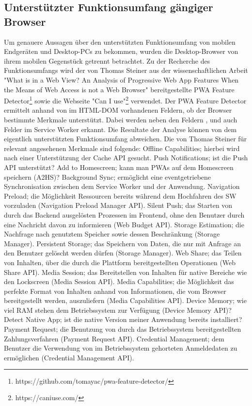 \subsection{Unterstützter Funktionsumfang gängiger Browser}
\label{subsec:unterstuetzterfunktionsumfanggaengigerbrowser}
Um genauere Aussagen über den unterstützten Funktionsumfang von mobilen Endgeräten
und Desktop-PCs zu bekommen, wurden die Desktop-Browser von ihrem mobilen
Gegenstück getrennt betrachtet. Zu der Recherche des Funktionsumfangs wird
der von Thomas Steiner aus der wissenschaftlichen Arbeit "What is
in a Web View? An Analysis of Progressive Web App Features When the
Means of Web Access is not a Web Browser" bereitgestellte
PWA Feature Detector\footnote{https://github.com/tomayac/pwa-feature-detector/} sowie 
die Webseite "Can I use"\footnote{https://caniuse.com/} verwendet.
Der PWA Feature Detector ermittelt anhand von im HTML-DOM
vorhandenen Feldern, ob der Browser bestimmte Merkmale unterstützt.
Dabei werden neben den Feldern ,  und 
auch Felder im Service Worker erkannt. Die Resultate der Analyse können von dem
eigentlich unterstützten Funktionsumfang abweichen. Die von Thomas
Steiner für relevant angesehenen Merkmale sind folgende:
Offline Capabilities; hierbei wird nach
einer Unterstützung der Cache API gesucht. Push Notifications;
ist die Push API unterstützt? Add to Homescreen; kann man PWAs auf
dem Homescreen speichern (A2HS)? Background Sync; ermöglicht eine eventgetriebene Synchronisation
zwischen dem Service Worker und der Anwendung. Navigation Preload; die Möglichkeit
Ressourcen bereits während dem Hochfahren des SW vorzuladen
(Navigation Preload Manager API). Silent Push; das Starten von durch das
Backend ausgelösten Prozessen im Frontend, ohne den Benutzer
durch eine Nachricht davon zu informieren (Web Budget API).
Storage Estimation; die Nachfrage nach genutztem Speicher sowie
dessen Beschränkung (Storage Manager). Persistent Storage;
das Speichern von Daten, die nur mit Anfrage an den Benutzer gelöscht
werden dürfen (Storage Manager). Web Share; das Teilen von Inhalten,
über die durch die Plattform bereitgestellten Operationen (Web Share API).
Media Session; das Bereitstellen von Inhalten für native
Bereiche wie den Lockscreen (Media Session API). Media Capabilities;
die Möglichkeit das perfekte Format von Inhalten anhand von
Informationen, die vom Browser bereitgestellt werden, auszuliefern (Media Capabilities API).
Device Memory; wie viel RAM stehen dem Betriebssystem zur
Verfügung (Device Memory API)? Detect Native App; ist die native Version
meiner Anwendung bereits installiert? Payment Request;
die Benutzung von durch das Betriebssystem bereitgestellten
Zahlungsverfahren (Payment Request API). Credential Management;
dem Benutzer die Verwendung von im Betriebssystem gehorteten
Anmeldedaten zu ermöglichen (Credential Management API).\cite[Abschnitt 2.3]{WhatIsInAWebView}


